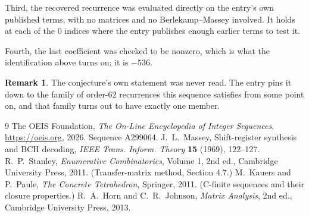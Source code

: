 \documentclass[11pt,a4paper]{article}
\theoremstyle{plain}
\theoremstyle{definition}
\newtheorem{remark}[theorem]{Remark}
\begin{document}
Third, the recovered recurrence was evaluated directly on the entry's own published terms, with
no matrices and no Berlekamp--Massey involved. It holds at each of the $0$ indices where
the entry publishes enough earlier terms to test it.

Fourth, the last coefficient was checked to be nonzero, which is what the identification above
turns on; it is $-536$.

\begin{remark}
The conjecture's own statement was never read. The entry pins it down to the family of
order-$62$ recurrences this sequence satisfies from some point on, and that family turns
out to have exactly one member.
\end{remark}

\begin{thebibliography}{9}
 The OEIS Foundation, \emph{The On-Line Encyclopedia of Integer
Sequences}, \url{https://oeis.org}, 2026. Sequence A299064.
 J.~L.~Massey, Shift-register synthesis and BCH decoding, \emph{IEEE
Trans. Inform. Theory} \textbf{15} (1969), 122--127.
 R.~P.~Stanley, \emph{Enumerative Combinatorics}, Volume 1, 2nd ed.,
Cambridge University Press, 2011. (Transfer-matrix method, Section 4.7.)
 M.~Kauers and P.~Paule, \emph{The Concrete Tetrahedron}, Springer, 2011.
(C-finite sequences and their closure properties.)
 R.~A.~Horn and C.~R.~Johnson, \emph{Matrix Analysis}, 2nd ed., Cambridge
University Press, 2013.
\end{thebibliography}
\end{document}
